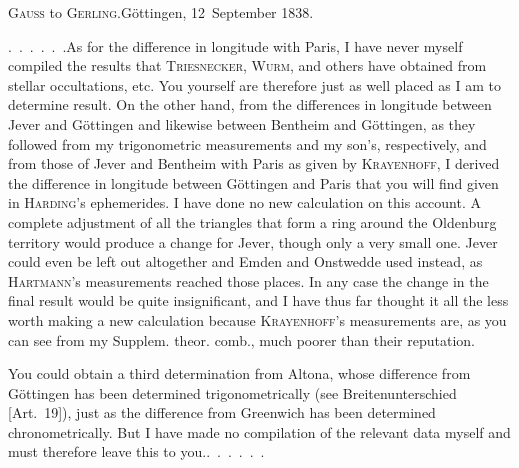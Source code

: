 \begin{center}
\textsc{Gauss} to \textsc{Gerling}.\quad Göttingen, 12~September 1838.
\end{center}
\par\noindent\hspace*{\parindent}\mbox{.\ .\ .\ .\ .\ .}\quad As for the difference in longitude with Paris, I have never myself compiled the results that \textsc{Triesnecker}, \textsc{Wurm}, and others have obtained from stellar occultations, etc. You yourself are therefore just as well placed as I am to determine  result. On the other hand, from the differences in longitude between Jever and Göttingen and likewise between Bentheim and Göttingen, as they followed from my trigonometric measurements and my son's, respectively, and from those of Jever and Bentheim with Paris as given by \textsc{Krayenhoff}, I derived the difference in longitude between Göttingen and Paris that you will find given in \textsc{Harding}'s ephemerides. I have done no new calculation on this account. A complete adjustment of all the triangles that form a ring around the Oldenburg territory would produce a change for Jever, though only a very small one. Jever could even be left out altogether and Emden and Onstwedde used instead, as \textsc{Hartmann}'s measurements reached those places. In any case the change in the final result would be quite insignificant, and I have thus far thought it all the less worth making a new calculation because \textsc{Krayenhoff}'s measurements are, as you can see from my Supplem. theor. comb., much poorer than their reputation.
\par\noindent\hspace*{\parindent}You could obtain a third determination from Altona, whose difference from Göttingen has been determined trigonometrically (see Breitenunterschied [Art.~19]), just as the difference from Greenwich has been determined chronometrically. But I have made no compilation of the relevant data myself and must therefore leave this to you.\quad\mbox{.\ .\ .\ .\ .\ .}

